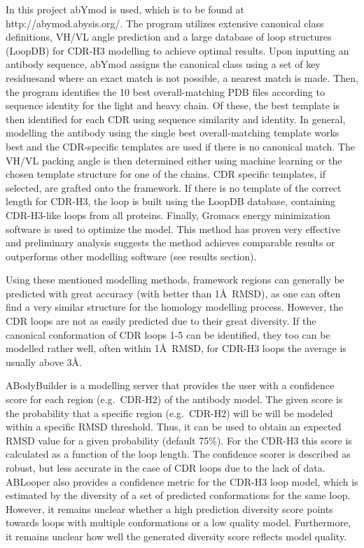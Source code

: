 \documentclass[12pt]{article}
\begin{document}
In this project abYmod is used, which is to be found at
http://abymod.abysis.org/. The program utilizes extensive canonical
class definitions, VH/VL angle prediction and a large database of loop
structures (LoopDB) for CDR-H3 modelling to achieve optimal
results. Upon inputting an antibody sequence, abYmod assigns the
canonical class using a set of key residues\cite{Martin1996}and where
an exact match is not possible, a nearest match is made. Then, the
program identifies the 10 best overall-matching PDB files according to
sequence identity for the light and heavy chain. Of these, the best
template is then identified for each CDR using sequence similarity and
identity. In general, modelling the antibody using the single best
overall-matching template works best and the CDR-specific templates
are used if there is no canonical match. The VH/VL packing angle is
then determined either using machine learning or the chosen template
structure for one of the chains. CDR specific templates, if selected,
are grafted onto the framework. If there is no template of the correct
length for CDR-H3, the loop is built using the LoopDB database,
containing CDR-H3-like loops from all proteins. Finally, Gromacs energy
minimization software is used to optimize the model. This method has
proven very effective and preliminary analysis suggests the method
achieves comparable results or outperforms other modelling software
(see results section).

Using these mentioned modelling methods, framework regions can
generally be predicted with great accuracy (with better than 1\AA\
RMSD\cite{Almagro2014}), as one can often find a very similar
structure for the homology modelling process.  However, the CDR loops
are not as easily predicted due to their great diversity. If the
canonical conformation of CDR loops 1-5 can be identified, they too
can be modelled rather well, often within 1\AA\ RMSD, for CDR-H3 loops
the average is usually above 3\AA\cite{Almagro2011}.

ABodyBuilder is a modelling server that provides the user with a
confidence score for each region (e.g.\ CDR-H2) of the antibody
model. The given score is the probability that a specific region
(e.g.\ CDR-H2) will be will be modeled within a specific RMSD
threshold\cite{Leem2016}. Thus, it can be used to obtain an expected
RMSD value for a given probability (default 75\%). For the CDR-H3 this
score is calculated as a function of the loop length.  The confidence
scorer is described as robust, but less accurate in the case of CDR
loops due to the lack of data\cite{Leem2016}. ABLooper also provides a
confidence metric for the CDR-H3 loop model, which is estimated by the
diversity of a set of predicted conformations for the same
loop\cite{Abanades2022}. However, it remains unclear whether a high
prediction diversity score points towards loops with multiple
conformations or a low quality model. Furthermore, it remains unclear
how well the generated diversity score reflects model
quality\cite{Abanades2022}.
\end{document}
